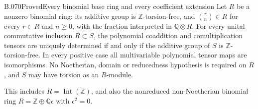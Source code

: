\begin{saresult}{B.070}{Proved}{Every binomial base ring and every coefficient extension}
Let $R$ be a nonzero binomial ring: its additive group is
$\mathbb Z$-torsion-free, and $\binom r n\in R$ for every $r\in R$ and
$n\ge0$, with the fraction interpreted in $\mathbb Q\otimes R$.
For every unital commutative inclusion $R\subset S$, the polynomial
coaddition and comultiplication tensors are uniquely determined if and
only if the additive group of $S$ is $\mathbb Z$-torsion-free.
In every positive case all multivariable polynomial tensor maps are
isomorphisms. No Noetherian, domain or reducedness hypothesis is required
on $R$, and $S$ may have torsion as an $R$-module.

This includes $R=\operatorname{Int}(\mathbb Z)$, and also the nonreduced
non-Noetherian binomial ring $R=\mathbb Z\oplus\mathbb Q\epsilon$ with
$\epsilon^2=0$.
\end{saresult}
